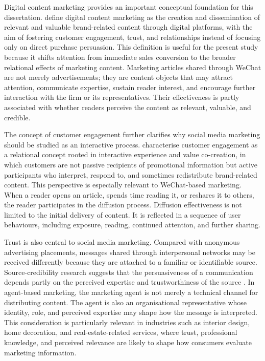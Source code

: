 Digital content marketing provides an important conceptual foundation for this dissertation. \textcite{hollebeek2019} define digital content marketing as the creation and dissemination of relevant and valuable brand-related content through digital platforms, with the aim of fostering customer engagement, trust, and relationships instead of focusing only on direct purchase persuasion. This definition is useful for the present study because it shifts attention from immediate sales conversion to the broader relational effects of marketing content. Marketing articles shared through WeChat are not merely advertisements; they are content objects that may attract attention, communicate expertise, sustain reader interest, and encourage further interaction with the firm or its representatives. Their effectiveness is partly associated with whether readers perceive the content as relevant, valuable, and credible.

The concept of customer engagement further clarifies why social media marketing should be studied as an interactive process. \textcite{brodie2011} characterise customer engagement as a relational concept rooted in interactive experience and value co-creation, in which customers are not passive recipients of promotional information but active participants who interpret, respond to, and sometimes redistribute brand-related content. This perspective is especially relevant to WeChat-based marketing. When a reader opens an article, spends time reading it, or reshares it to others, the reader participates in the diffusion process. Diffusion effectiveness is not limited to the initial delivery of content. It is reflected in a sequence of user behaviours, including exposure, reading, continued attention, and further sharing.

Trust is also central to social media marketing. Compared with anonymous advertising placements, messages shared through interpersonal networks may be received differently because they are attached to a familiar or identifiable source. Source-credibility research suggests that the persuasiveness of a communication depends partly on the perceived expertise and trustworthiness of the source \parencite{ohanian1990}. In agent-based marketing, the marketing agent is not merely a technical channel for distributing content. The agent is also an organisational representative whose identity, role, and perceived expertise may shape how the message is interpreted. This consideration is particularly relevant in industries such as interior design, home decoration, and real-estate-related services, where trust, professional knowledge, and perceived relevance are likely to shape how consumers evaluate marketing information.

